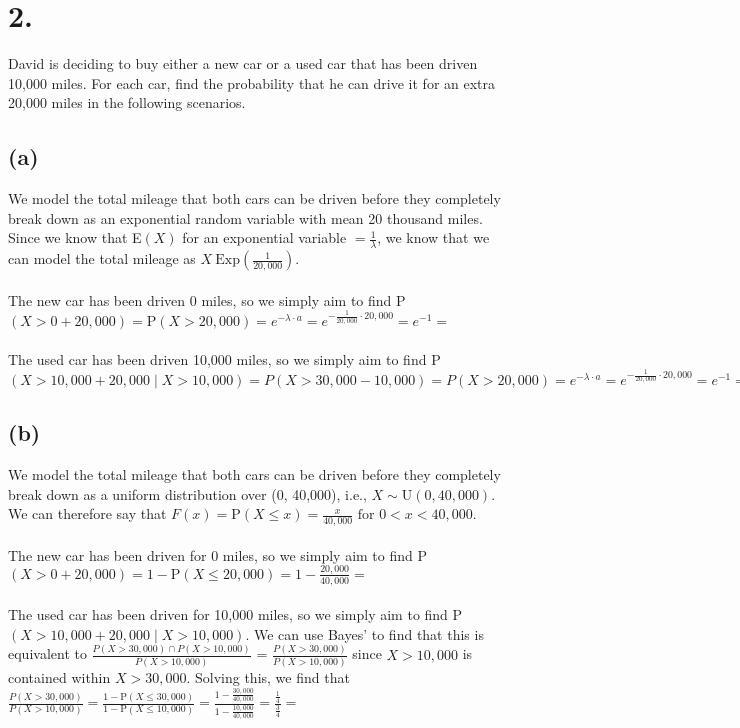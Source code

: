 \documentclass{article}
\begin{document}
\section*{2.}
{\Large

David is deciding to buy either a new car or a used car that has been driven 10,000 miles. For
each car, find the probability that he can drive it for an extra 20,000 miles in the following
scenarios.

\subsection*{(a)}
We model the total mileage that both cars can be driven before they completely break down as an
exponential random variable with mean 20 thousand miles. Since we know that E$(X)$ for an exponential variable $= \frac{1}{\lambda}$, we know that we can model the total mileage as $X ~ \text{Exp}(\frac{1}{20,000})$. \\ \\ 
The new car has been driven 0 miles, so we simply aim to find P$(X > 0 + 20,000) = \text{P}(X > 20,000) = e^{-\lambda \cdot a} = e^{-\frac{1}{20,000} \cdot 20,000} = e^{-1} = $  \\ \\ 
The used car has been driven 10,000 miles, so we simply aim to find P$(X > 10,000 + 20,000 \mid X > 10,000) = P(X > 30,000 - 10,000) = P(X > 20,000) = e^{-\lambda \cdot a} = e^{-\frac{1}{20,000} \cdot 20,000} = e^{-1} = $  \\ 

\subsection*{(b)}
We model the total mileage that both cars can be driven before they completely break down as a uniform distribution over (0, 40,000), i.e., $X \sim \text{U}(0, 40,000)$. We can therefore say that $F(x) = \text{P}(X \leq x) = \frac{x}{40,000} \text{ for } 0 < x < 40,000$. \\ \\
The new car has been driven for 0 miles, so we simply aim to find P$(X > 0 + 20,000) = 1 - \text{P}(X \leq 20,000) = 1 - \frac{20,000}{40,000} = $  \\ \\
The used car has been driven for 10,000 miles, so we simply aim to find P$(X > 10,000 + 20,000 \mid X > 10,000)$. We can use Bayes' to find that this is equivalent to $\frac{P(X > 30,000) \cap P(X > 10,000)}{P(X > 10,000)}$ = $\frac{P(X > 30,000)}{P(X > 10,000)}$ since $X > 10,000$ is contained within $X > 30,000$. Solving this, we find that \\
$\frac{P(X > 30,000)}{P(X > 10,000)} = \frac{1 - \text{P}(X \leq 30,000)}{1 - \text{P}(X \leq 10,000)} = \frac{1 - \frac{30,000}{40,000}}{1 - \frac{10,000}{40,000}} = \frac{\frac{1}{4}}{\frac{3}{4}} = $ 

}
\end{document}
